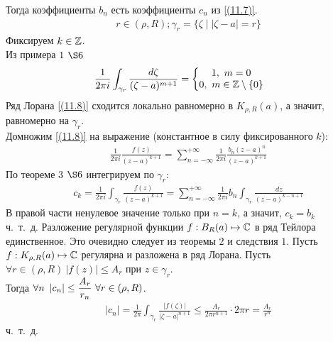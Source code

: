 Тогда коэффициенты $b_n$ есть коэффициенты $c_n$ из \eqref{(11.7)}.
\pr
\begin{align*}
  & r \in (\rho, R); \gamma_r = \{\zeta \mid \left| \zeta - a \right| = r\}
\end{align*}
Фиксируем $k \in \mathbb{Z}$.
\\
Из примера $1$ $\S 6$
\begin{align*}
  & \frac{1}{2 \pi i} \int_{\gamma_r}\frac{d\zeta}{(\zeta - a)^{m+1}} = \left\{ \begin{matrix}
          1, \ m = 0 \\
          0, \ m \in \mathbb{Z} \setminus\{0\}
      \end{matrix} \right.
\end{align*}
Ряд Лорана \eqref{(11.8)} сходится локально равномерно в $K_{\rho,R}(a)$,
а значит, равномерно на $\gamma_r$.
\\
Домножим \eqref{(11.8)} на выражение (константное в силу фиксированного
$k$):
\begin{align*}
  & \frac{1}{2\pi i}\frac{f(z)}{(z-a)^{k+1}} = \sum_{n = -\infty}^{+\infty} \frac{1}{2 \pi i}\frac{b_n(z-a)^n}{(z-a)^{k+1}}
\end{align*}
По теореме $3$ $\S 6$ интегрируем по $\gamma_r$:
\begin{align*}
  & c_k = \frac{1}{2 \pi i} \int_{\gamma_r}\frac{f(z)}{(z - a)^{k+1}} = \sum_{n = -\infty}^{+\infty} \frac{1}{2\pi i}b_n \int_{\gamma_r}\frac{dz}{(z-a)^{k-n+1}}
\end{align*}
В правой части ненулевое значение только при $n=k$, а значит, $c_k = b_k$
\\
ч.~т.~д.
\corollary
Разложение регулярной функции $f: B_R(a) \mapsto \mathbb{C}$ в ряд Тейлора
единственное.
\pr
Это очевидно следует из теоремы $2$ и следствия $1$.
\corollary
Пусть $f:K_{\rho,R}(a) \mapsto \mathbb{C}$ регулярна и разложена в ряд Лорана. Пусть
$\forall r \in (\rho, R) \ \left| f(z) \right|\leq A_r$ при $z \in \gamma_r$.
\\
Тогда $\forall n \ \left| c_n \right| \leq \displaystyle \frac{A_r}{r_n} \ \forall r \in
(\rho, R)$.
\pr
\begin{align*}
  & \left| c_n \right| = \frac{1}{2 \pi} \int_{\gamma_r}\frac{\left| f(\zeta) \right|}{\left| \zeta - a \right|^{n+1}} \leq \frac{A_r}{2 \pi r^{n+1}} \cdot 2 \pi r = \frac{A_r}{r^n}
\end{align*}
ч.~т.~д.
